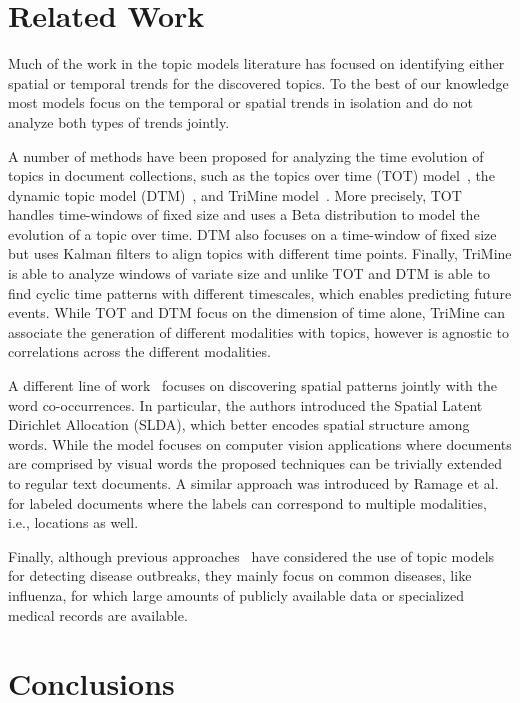 \documentclass[conference]{IEEEtran}
\begin{document}
\section{Related Work}
\label{sec:related_work}
Much of the work in the topic models literature has focused on identifying either spatial or temporal trends for the discovered topics. To the best of our knowledge most models focus on the temporal or spatial trends in isolation and do not analyze both types of trends jointly. 

A number of methods have been proposed for analyzing the time evolution of topics in document collections, such as the topics over time (TOT) model~\cite{wang:2006}, the dynamic topic model (DTM)~\cite{blei:2006}, and TriMine model~\cite{matsubara:2012}.  More precisely, TOT handles time-windows of fixed size and uses a Beta distribution to model the evolution of a topic over time. DTM  also focuses on a time-window of fixed size but uses Kalman filters to align topics with different time points. Finally, TriMine is able to analyze windows of variate size and unlike TOT and DTM is able to find cyclic time patterns with different timescales, which enables predicting future events. While TOT and DTM focus on the dimension of time alone, TriMine can associate the generation of different modalities with topics, however is agnostic to correlations across the different modalities.

A different line of work~\cite{wang:2007} focuses on discovering spatial patterns jointly with the word co-occurrences. In particular, the authors introduced the Spatial Latent Dirichlet Allocation (SLDA), which better encodes spatial structure among words. While the model focuses on computer vision applications where documents are comprised by visual words the proposed techniques can be trivially extended to regular text documents. A similar approach was introduced by Ramage et al.~\cite{ramage:2009} for labeled documents where the labels can correspond to multiple modalities, i.e., locations as well.

Finally, although previous approaches~\cite{paul:11, sadilek:2012, rider:2013} have considered the use of topic models for detecting disease outbreaks, they mainly focus on common diseases, like influenza, for which large amounts of publicly available data or specialized medical records are available. 

\section{Conclusions}
\label{sec:conclusion}
\end{document}

